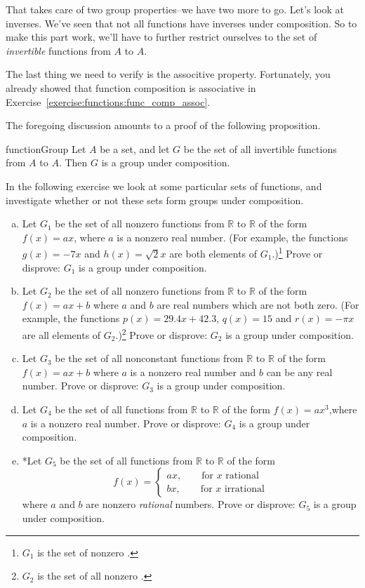That takes care of two group properties--we have two more to go. Let's look at inverses. We've seen that not all functions have inverses under composition. So to make this part work, we'll have to further restrict ourselves to the set of \emph{invertible} functions from $A$ to $A$.

The last thing we need to verify is the associtive property. Fortunately, you already showed that function composition is associative in Exercise~\ref{exercise:functions:func_comp_assoc}.

The foregoing discussion amounts to a proof of the following proposition.

\begin{prop}{functionGroup}
Let $A$ be a set, and let $G$ be the set of all invertible functions from $A$ to $A$. Then $G$ is a group under composition.
\end{prop}

In the following exercise we look at some particular sets of functions, and investigate whether or not these sets form groups under composition. 

\begin{exercise}{}
\begin{enumerate}[(a)]
\item
Let $G_1$ be the set of all nonzero functions from $\mathbb{R}$ to $\mathbb{R}$ of the form $f(x)=ax$, where $a$ is a nonzero real number.  (For example, the functions $g(x) = -7x$ and $h(x) = \sqrt{2}x$ are both elements of $G_1$.)\footnote{ $G_1$ is the set of nonzero .}
 Prove or disprove: $G_1$ is a group under composition.
\item
Let $G_2$ be the set of all nonzero functions  from $\mathbb{R}$ to $\mathbb{R}$ of the form $f(x)=ax+b$ where $a$ and $b$ are real numbers which are not both zero.  (For example, the functions $p(x) = 29.4x + 42.3$, $q(x) = 15$ and  $r(x) = -\pi x$ are all elements of $G_2$.)\footnote{$G_2$ is the set of all  nonzero .}
 Prove or disprove: $G_2$ is a group under composition.
\item
Let $G_3$ be the set of all  nonconstant  functions from $\mathbb{R}$ to $\mathbb{R}$ of the form $f(x)=ax+b$ where $a$ is a nonzero real number and $b$ can be any real number.  Prove or disprove: $G_3$ is a group under composition.
\item
Let $G_4$ be the set of all functions  from $\mathbb{R}$ to $\mathbb{R}$ of the form $f(x)=ax^3$,where $a$ is a nonzero real number.  Prove or disprove: $G_4$ is a group under composition.
\item
*Let $G_5$ be the set of all functions  from $\mathbb{R}$ to $\mathbb{R}$ of the form 
\[ f(x)= \begin{cases} ax, \qquad \text{for } x \text{ rational}\\ bx, \qquad \text{for } x \text{ irrational}
\end{cases}
\] 
where $a$ and $b$ are nonzero \emph{rational} numbers.  Prove or disprove: $G_5$ is a group under composition.
\end{enumerate}
\end{exercise}

